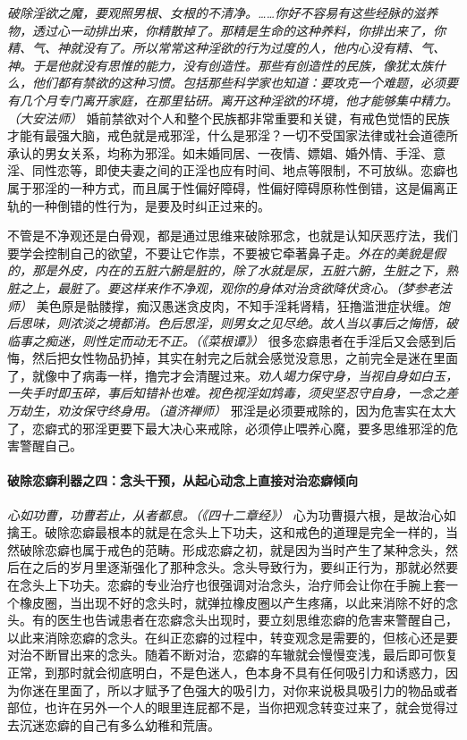 \textit{破除淫欲之魔，要观照男根、女根的不清净。……你好不容易有这些经脉的滋养物，透过心一动排出来，你精散掉了。那精是生命的这种养料，你排出来了，你精、气、神就没有了。所以常常这种淫欲的行为过度的人，他内心没有精、气、神。于是他就没有思惟的能力，没有创造性。那些有创造性的民族，像犹太族什么，他们都有禁欲的这种习惯。包括那些科学家也知道：要攻克一个难题，必须要有几个月专门离开家庭，在那里钻研。离开这种淫欲的环境，他才能够集中精力。（大安法师）} 婚前禁欲对个人和整个民族都非常重要和关键，有戒色觉悟的民族才能有最强大脑，戒色就是戒邪淫，什么是邪淫？一切不受国家法律或社会道德所承认的男女关系，均称为邪淫。如未婚同居、一夜情、嫖娼、婚外情、手淫、意淫、同性恋等，即使夫妻之间的正淫也应有时间、地点等限制，不可放纵。恋癖也属于邪淫的一种方式，而且属于性偏好障碍，性偏好障碍原称性倒错，这是偏离正轨的一种倒错的性行为，是要及时纠正过来的。

不管是不净观还是白骨观，都是通过思维来破除邪念，也就是认知厌恶疗法，我们要学会控制自己的欲望，不要让它作祟，不要被它牵著鼻子走。\textit{外在的美貌是假的，那是外皮，内在的五脏六腑是脏的，除了水就是尿，五脏六腑，生脏之下，熟脏之上，最脏了。要这样来作不净观，观你的身体对治贪欲降伏贪心。（梦参老法师）} 美色原是骷髅撑，痴汉愚迷贪皮肉，不知手淫耗肾精，狂撸滥泄症状缠。\textit{饱后思味，则浓淡之境都消。色后思淫，则男女之见尽绝。故人当以事后之悔悟，破临事之痴迷，则性定而动无不正。（《菜根谭》）} 很多恋癖患者在手淫后又会感到后悔，然后把女性物品扔掉，其实在射完之后就会感觉没意思，之前完全是迷在里面了，就像中了病毒一样，撸完才会清醒过来。\textit{劝人竭力保守身，当视自身如白玉，一失手时即玉碎，事后知错补也难。视色视淫如鸩毒，须臾坚忍守自身，一念之差万劫生，劝汝保守终身用。（道济禅师）} 邪淫是必须要戒除的，因为危害实在太大了，恋癖式的邪淫更要下最大决心来戒除，必须停止喂养心魔，要多思维邪淫的危害警醒自己。

\paragraph{破除恋癖利器之四：念头干预，从起心动念上直接对治恋癖倾向}

\textit{心如功曹，功曹若止，从者都息。（《四十二章经》）} 心为功曹摄六根，是故治心如擒王。破除恋癖最根本的就是在念头上下功夫，这和戒色的道理是完全一样的，当然破除恋癖也属于戒色的范畴。形成恋癖之初，就是因为当时产生了某种念头，然后在之后的岁月里逐渐强化了那种念头。念头导致行为，要纠正行为，那就必然要在念头上下功夫。恋癖的专业治疗也很强调对治念头，治疗师会让你在手腕上套一个橡皮圈，当出现不好的念头时，就弹拉橡皮圈以产生疼痛，以此来消除不好的念头。有的医生也告诫患者在恋癖念头出现时，要立刻思维恋癖的危害来警醒自己，以此来消除恋癖的念头。在纠正恋癖的过程中，转变观念是需要的，但核心还是要对治不断冒出来的念头。随着不断对治，恋癖的车辙就会慢慢变浅，最后即可恢复正常，到那时就会彻底明白，不是色迷人，色本身不具有任何吸引力和诱惑力，因为你迷在里面了，所以才赋予了色强大的吸引力，对你来说极具吸引力的物品或者部位，也许在另外一个人的眼里连屁都不是，当你把观念转变过来了，就会觉得过去沉迷恋癖的自己有多么幼稚和荒唐。

